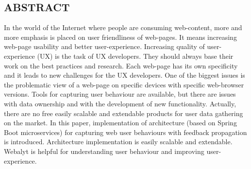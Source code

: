 \documentclass[landscape]{a0poster}
\begin{document}
\begin{multicols}{3} %


\color{MainColor} 
\section*{ABSTRACT}
\color{black}

In the world of the Internet where people are consuming web-content,  more and more emphasis is placed on user friendliness of web-pages. It means increasing web-page usability and better user-experience. Increasing quality of user-experience (UX) is the task of UX developers. They should always base their work on the best practices and research. Each web-page has its own specificity and it leads to new challenges for the UX developers. One of the biggest issues is the problematic view of a web-page on specific devices with specific web-browser versions. Tools for capturing user behaviour are available, but there are issues with data ownership and with the development of new functionality. Actually, there are no free easily scalable and extendable products for user data gathering on the market.  
  In this paper, implementation of architecture (based on Spring Boot microservices) for capturing web user behaviours with feedback propagation is introduced. Architecture implementation is easily scalable and extendable. Webalyt is helpful for understanding user behaviour and improving user-experience. 



\color{MainColor} 

\end{multicols}
\end{document}
